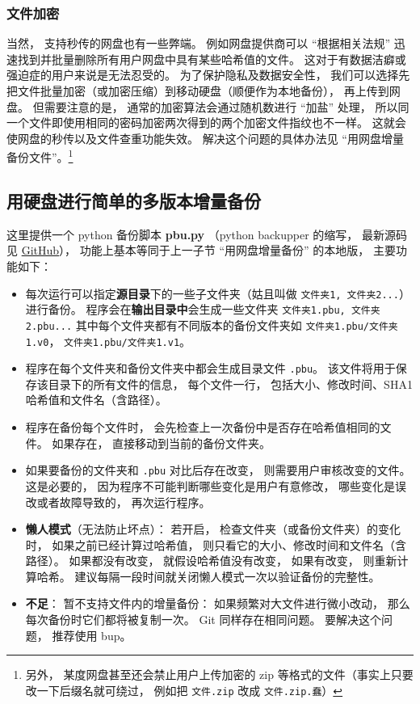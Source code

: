 \subsubsection{文件加密}
当然， 支持秒传的网盘也有一些弊端。 例如网盘提供商可以 “根据相关法规” 迅速找到并批量删除所有用户网盘中具有某些哈希值的文件。 这对于有数据洁癖或强迫症的用户来说是无法忍受的。 为了保护隐私及数据安全性， 我们可以选择先把文件批量加密（或加密压缩）到移动硬盘（顺便作为本地备份）， 再上传到网盘。 但需要注意的是， 通常的加密算法会通过随机数进行 “加盐” 处理， 所以同一个文件即使用相同的密码加密两次得到的两个加密文件指纹也不一样。 这就会使网盘的秒传以及文件查重功能失效。 解决这个问题的具体办法见 “用网盘增量备份文件”。\footnote{另外， 某度网盘甚至还会禁止用户上传加密的 zip 等格式的文件（事实上只要改一下后缀名就可绕过， 例如把 \verb|文件.zip| 改成 \verb|文件.zip.蠢|）}

\subsection{用硬盘进行简单的多版本增量备份}
这里提供一个 python 备份脚本 \textbf{pbu.py} （python backupper 的缩写， 最新源码见 \href{https://github.com/MacroUniverse/pbu}{GitHub}）， 功能上基本等同于上一子节 “用网盘增量备份” 的本地版， 主要功能如下：
\begin{itemize}
\item 每次运行可以指定\textbf{源目录}下的一些子文件夹（姑且叫做 \verb|文件夹1, 文件夹2...|）进行备份。 程序会在\textbf{输出目录中}会生成一些文件夹 \verb|文件夹1.pbu, 文件夹2.pbu...| 其中每个文件夹都有不同版本的备份文件夹如 \verb|文件夹1.pbu/文件夹1.v0|， \verb|文件夹1.pbu/文件夹1.v1|。
\item 程序在每个文件夹和备份文件夹中都会生成目录文件 \verb|.pbu|。 该文件将用于保存该目录下的所有文件的信息， 每个文件一行， 包括大小、修改时间、SHA1 哈希值和文件名（含路径）。
\item 程序在备份每个文件时， 会先检查上一次备份中是否存在哈希值相同的文件。 如果存在， 直接移动到当前的备份文件夹。
\item 如果要备份的文件夹和 \verb|.pbu| 对比后存在改变， 则需要用户审核改变的文件。 这是必要的， 因为程序不可能判断哪些变化是用户有意修改， 哪些变化是误改或者故障导致的， 再次运行程序。
\item \textbf{懒人模式}（无法防止坏点）： 若开启， 检查文件夹（或备份文件夹）的变化时， 如果之前已经计算过哈希值， 则只看它的大小、修改时间和文件名（含路径）。 如果都没有改变， 就假设哈希值没有改变， 如果有改变， 则重新计算哈希。 建议每隔一段时间就关闭懒人模式一次以验证备份的完整性。
\item \textbf{不足}： 暂不支持文件内的增量备份： 如果频繁对大文件进行微小改动， 那么每次备份时它们都将被复制一次。 Git 同样存在相同问题。 要解决这个问题， 推荐使用 bup。
\end{itemize}
